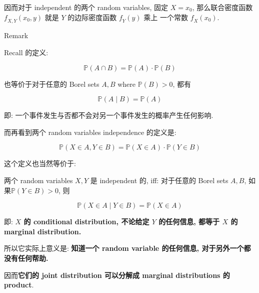 因而对于 independent 的两个 random variables, 固定 \(\mathit{X} = \mathit{x}_{0}\), 那么联合密度函数 \(\mathit{f}_{\mathit{X},\mathit{Y}}(\mathit{x}_{0},\mathit{y})\) 就是 \(\mathit{Y}\) 的边际密度函数 \(\mathit{f}_{\mathit{Y}}(\mathit{y})\) 乘上 一个常数 \(\mathit{f}_{\mathit{X}}(\mathit{x}_{0})\).\\

\begin{qlremark}{Remark}

Recall  的定义:

\[\mathbb{P}(\mathit{A} \cap \mathit{B}) = \mathbb{P}(\mathit{A}) \cdot \mathbb{P}(\mathit{B})\]

也等价于对于任意的 Borel sets \(\mathit{A},\mathit{B}\) where \(\mathbb{P}(\mathit{B}) > 0\), 都有

\[\mathbb{P}(\mathit{A} \mid \mathit{B}) = \mathbb{P}(\mathit{A})\]

即: 一个事件发生与否都不会对另一个事件发生的概率产生任何影响.

而再看到两个 random variables independence 的定义是:

\[\mathbb{P}(\mathit{X} \in \mathit{A},\mathit{Y} \in \mathit{B}) = \mathbb{P}(\mathit{X} \in \mathit{A}) \cdot \mathbb{P}(\mathit{Y} \in \mathit{B})\]

这个定义也当然等价于:

\begin{proposition}{}

两个 random variables \(\mathit{X},\mathit{Y}\) 是 independent 的, iff: 对于任意的 Borel sets \(\mathit{A},\mathit{B}\), 如果\(\mathbb{P}(\mathit{Y} \in \mathit{B}) > 0\), 则

\[\mathbb{P}(\mathit{X} \in \mathit{A} \mid \mathit{Y} \in \mathit{B}) = \mathbb{P}(\mathit{X} \in \mathit{A})\]

即: \textbf{\(\mathit{X}\) 的 conditional distribution, 不论给定 \(\mathit{Y}\) 的任何信息, 都等于 \(\mathit{X}\) 的 marginal distribution.}

\end{proposition}

所以它实际上意义是: \textbf{知道一个 random variable 的任何信息, 对于另外一个都没有任何帮助.}

因而\textbf{它们的 joint distribution 可以分解成 marginal distributions 的 product}.\\

\end{qlremark}

